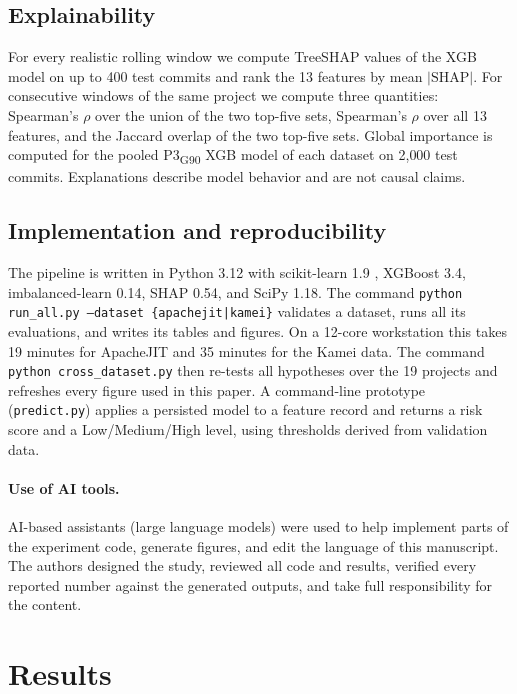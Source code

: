 \documentclass[11pt,a4paper]{article}
\newcommand{\pthree}{P3\textsubscript{G90}}
\begin{document}
\subsection{Explainability}\label{sec:shap}

For every realistic rolling window we compute TreeSHAP values \citep{lundberg2017} of the XGB model on up to 400 test commits and rank the 13 features by mean $|\text{SHAP}|$. For consecutive windows of the same project we compute three quantities: Spearman's $\rho$ over the union of the two top-five sets, Spearman's $\rho$ over all 13 features, and the Jaccard overlap of the two top-five sets. Global importance is computed for the pooled \pthree{} XGB model of each dataset on 2{,}000 test commits. Explanations describe model behavior and are not causal claims.

\subsection{Implementation and reproducibility}\label{sec:repro}

The pipeline is written in Python 3.12 with scikit-learn 1.9 \citep{pedregosa2011}, XGBoost 3.4, imbalanced-learn 0.14, SHAP 0.54, and SciPy 1.18. The command \texttt{python run\_all.py --dataset \{apachejit|kamei\}} validates a dataset, runs all its evaluations, and writes its tables and figures. On a 12-core workstation this takes 19 minutes for ApacheJIT and 35 minutes for the Kamei data. The command \texttt{python cross\_dataset.py} then re-tests all hypotheses over the 19 projects and refreshes every figure used in this paper. A command-line prototype (\texttt{predict.py}) applies a persisted model to a feature record and returns a risk score and a Low/Medium/High level, using thresholds derived from validation data.

\paragraph{Use of AI tools.} AI-based assistants (large language models) were used to help implement parts of the experiment code, generate figures, and edit the language of this manuscript. The authors designed the study, reviewed all code and results, verified every reported number against the generated outputs, and take full responsibility for the content.

\section{Results}\label{sec:results}
\end{document}
